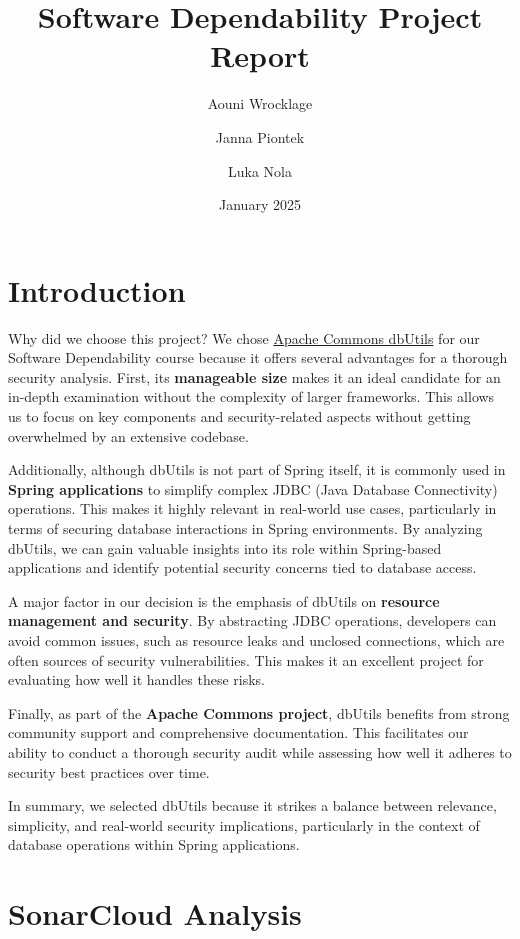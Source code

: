 \documentclass[sigconf]{acmart}
\title{Software Dependability Project Report}
\author{Aouni Wrocklage}\author{Janna Piontek}\author{Luka Nola}
\affiliation{%
  \url{https://github.com/orgs/Erasmus-In-Salerno/repositories}
}
\date{January 2025}
\begin{document}
\maketitle
\pagestyle{plain}


\section{Introduction}

Why did we choose this project?
We chose \href{https://commons.apache.org/proper/commons-dbutils/}{Apache Commons dbUtils} for our Software Dependability course because it offers several advantages for a thorough security analysis. First, its \textbf{manageable size} makes it an ideal candidate for an in-depth examination without the complexity of larger frameworks. This allows us to focus on key components and security-related aspects without getting overwhelmed by an extensive codebase.

Additionally, although dbUtils is not part of Spring itself, it is commonly used in \textbf{Spring applications} to simplify complex JDBC (Java Database Connectivity) operations. This makes it highly relevant in real-world use cases, particularly in terms of securing database interactions in Spring environments. By analyzing dbUtils, we can gain valuable insights into its role within Spring-based applications and identify potential security concerns tied to database access.

A major factor in our decision is the emphasis of dbUtils on \textbf{resource management and security}. By abstracting JDBC operations, developers can avoid common issues, such as resource leaks and unclosed connections, which are often sources of security vulnerabilities. This makes it an excellent project for evaluating how well it handles these risks.

Finally, as part of the \textbf{Apache Commons project}, dbUtils benefits from strong community support and comprehensive documentation. This facilitates our ability to conduct a thorough security audit while assessing how well it adheres to security best practices over time.

In summary, we selected dbUtils because it strikes a balance between relevance, simplicity, and real-world security implications, particularly in the context of database operations within Spring applications.


\section{SonarCloud Analysis}
\end{document}
